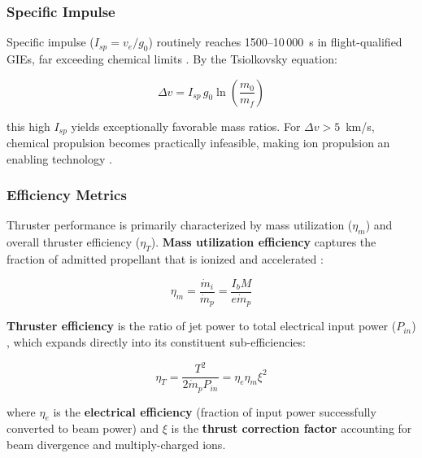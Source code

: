 \subsubsection{Specific Impulse}

Specific impulse ($I_{sp} = v_e/g_0$) routinely reaches 1500--10\,000~s in flight-qualified GIEs, far exceeding chemical limits \cite{holste_2020}. By the Tsiolkovsky equation:

\begin{equation}
\label{eq:tsiolkovsky}
    \Delta v = I_{sp} \, g_0 \ln\left(\frac{m_0}{m_f}\right)
\end{equation}

this high $I_{sp}$ yields exceptionally favorable mass ratios. For $\Delta v > 5$~km/s, chemical propulsion becomes practically infeasible, making ion propulsion an enabling technology \cite{holste_2020}.

\subsubsection{Efficiency Metrics}

Thruster performance is primarily characterized by mass utilization ($\eta_m$) and overall thruster efficiency ($\eta_T$). \textbf{Mass utilization efficiency} captures the fraction of admitted propellant that is ionized and accelerated \cite{holste_2020}:

\begin{equation}
\label{eq:ion_massutil}
    \eta_m = \frac{\dot{m}_i}{\dot{m}_p} = \frac{I_b M}{e \dot{m}_p}
\end{equation}

\textbf{Thruster efficiency} is the ratio of jet power to total electrical input power ($P_{in}$) \cite{holste_2020, fep_book}, which expands directly into its constituent sub-efficiencies:

\begin{equation}
\label{eq:ion_eff}
    \eta_T = \frac{T^2}{2 \dot{m}_p P_{in}} = \eta_e \eta_m \xi^2
\end{equation}

where $\eta_e$ is the \textbf{electrical efficiency} (fraction of input power successfully converted to beam power) and $\xi$ is the \textbf{thrust correction factor} accounting for beam divergence and multiply-charged ions. %

